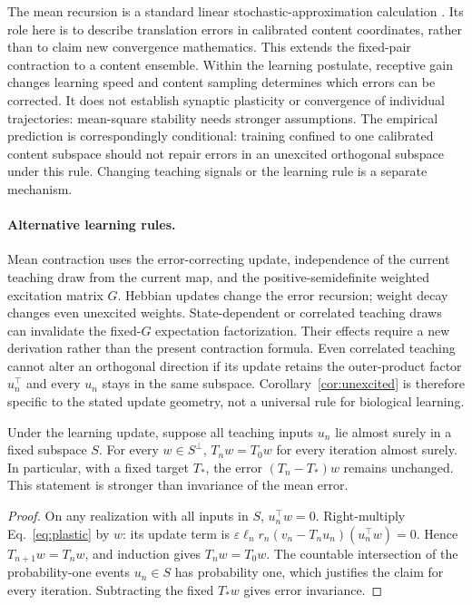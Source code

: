 \documentclass[submission,nolinenumbers]{esj}
\begin{document}
The mean recursion is a standard linear stochastic-approximation calculation \citep{benveniste1990,kushner2003}. Its role here is to describe translation errors in calibrated content coordinates, rather than to claim new convergence mathematics. This extends the fixed-pair contraction to a content ensemble. Within the learning postulate, receptive gain changes learning speed and content sampling determines which errors can be corrected. It does not establish synaptic plasticity or convergence of individual trajectories: mean-square stability needs stronger assumptions. The empirical prediction is correspondingly conditional: training confined to one calibrated content subspace should not repair errors in an unexcited orthogonal subspace under this rule. Changing teaching signals or the learning rule is a separate mechanism.

\paragraph{Alternative learning rules.} Mean contraction uses the error-correcting update, independence of the current teaching draw from the current map, and the positive-semidefinite weighted excitation matrix $G$. Hebbian updates change the error recursion; weight decay changes even unexcited weights. State-dependent or correlated teaching draws can invalidate the fixed-$G$ expectation factorization. Their effects require a new derivation rather than the present contraction formula. Even correlated teaching cannot alter an orthogonal direction if its update retains the outer-product factor $u_n^\top$ and every $u_n$ stays in the same subspace. Corollary~\ref{cor:unexcited} is therefore specific to the stated update geometry, not a universal rule for biological learning.

\begin{corollary}\label{cor:unexcited}
Under the learning update, suppose all teaching inputs $u_n$ lie almost surely in a fixed subspace $S$. For every $w\in S^\perp$, $T_nw=T_0w$ for every iteration almost surely. In particular, with a fixed target $T_*$, the error $(T_n-T_*)w$ remains unchanged. This statement is stronger than invariance of the mean error.
\end{corollary}
\begin{proof}
On any realization with all inputs in $S$, $u_n^\top w=0$. Right-multiply Eq.~\eqref{eq:plastic} by $w$: its update term is $\varepsilon\ell_nr_n(v_n-T_nu_n)(u_n^\top w)=0$. Hence $T_{n+1}w=T_nw$, and induction gives $T_nw=T_0w$. The countable intersection of the probability-one events $u_n\in S$ has probability one, which justifies the claim for every iteration. Subtracting the fixed $T_*w$ gives error invariance.
\end{proof}
\end{document}
